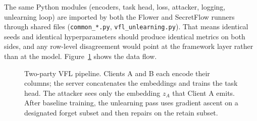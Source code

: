 \documentclass[letterpaper,twocolumn,10pt]{article}
\begin{document}
The same Python modules (encoders, task head, loss, attacker, logging,
unlearning loop) are imported by both the Flower and SecretFlow runners
through shared files (\texttt{common\_*.py}, \texttt{vfl\_unlearning.py}).
That means identical seeds and identical hyperparameters should produce
identical metrics on both sides, and any row-level disagreement would
point at the framework layer rather than at the model. Figure~\ref{fig:pipeline}
shows the data flow.

\begin{figure}[t]
\centering
{}
\caption{Two-party VFL pipeline. Clients A and B each encode their
columns; the server concatenates the embeddings and trains the task head.
The attacker sees only the embedding $z_A$ that Client A emits.
After baseline training, the unlearning pass uses gradient ascent on a
designated forget subset and then repairs on the retain subset.}
\label{fig:pipeline}
\end{figure}
\end{document}
